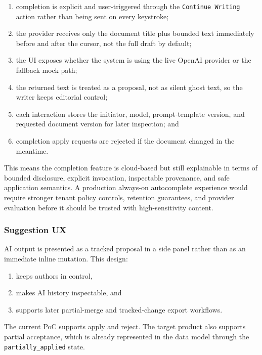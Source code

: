 \begin{enumerate}[leftmargin=1.4em]
    \item completion is explicit and user-triggered through the \texttt{Continue Writing} action rather than being sent on every keystroke;
    \item the provider receives only the document title plus bounded text immediately before and after the cursor, not the full draft by default;
    \item the UI exposes whether the system is using the live OpenAI provider or the fallback mock path;
    \item the returned text is treated as a proposal, not as silent ghost text, so the writer keeps editorial control;
    \item each interaction stores the initiator, model, prompt-template version, and requested document version for later inspection; and
    \item completion apply requests are rejected if the document changed in the meantime.
\end{enumerate}

This means the completion feature is cloud-based but still explainable in terms of bounded disclosure, explicit invocation, inspectable provenance, and safe application semantics. A production always-on autocomplete experience would require stronger tenant policy controls, retention guarantees, and provider evaluation before it should be trusted with high-sensitivity content.

\subsubsection{Suggestion UX}

AI output is presented as a tracked proposal in a side panel rather than as an immediate inline mutation. This design:

\begin{enumerate}[leftmargin=1.4em]
    \item keeps authors in control,
    \item makes AI history inspectable, and
    \item supports later partial-merge and tracked-change export workflows.
\end{enumerate}

The current PoC supports apply and reject. The target product also supports partial acceptance, which is already represented in the data model through the \texttt{partially\_applied} state.

